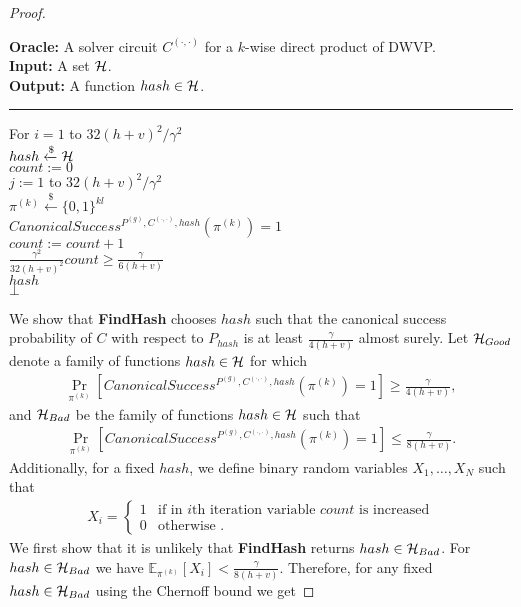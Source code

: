 \begin{proof}
\begin{codeblock}
  \textbf{Oracle:} A solver circuit $C^{(\cdot, \cdot)}$ for a $k$-wise direct product of DWVP. \\
  \textbf{Input:} A set $\mathcal{H}$.\\
  \textbf{Output:} A function $hash \in \mathcal{H}$.
  \medskip\hrule\medskip
  For $i = 1$ to $32(h+v)^2/\gamma^2$ \\
  \IndI $hash \xleftarrow{\$} \mathcal{H}$ \\
  \IndI $count := 0$ \\
  \IndI \For $j := 1$ to $32(h+v)^2/\gamma^2$ \\
  \IndII $\pi^{(k)} \xleftarrow{\$} \{0,1\}^{kl} $\\
  \IndII \If $CanonicalSuccess^{P^{(g)}, C^{(\cdot, \cdot)}, hash}(\pi^{(k)}) = 1$ \then \\
  \IndIII $count := count + 1$\\
  \IndI \If $\frac{\gamma^2}{32(h+v)^2} count \geq \frac{\gamma}{6(h+v)}$ \\
  \IndII \return $hash$\\
  \return $\bot$
\end{codeblock}
We show that \textbf{FindHash} chooses $hash$ such
that the canonical success probability of $C$
with respect to $P_{hash}$ is at least $\frac{\gamma}{4(h+v)}$ almost surely.
Let $\mathcal{H}_{Good}$ denote a family of functions $hash \in \mathcal{H}$ for which
\begin{align*}
\underset{\pi^{(k)}}{\Pr}[CanonicalSuccess^{P^{(g)}, C^{(\cdot, \cdot)}, hash}(\pi^{(k)}) = 1] \geq \frac{\gamma}{4(h+v)},
\end{align*}
and $\mathcal{H}_{Bad}$ be the family of functions $hash \in \mathcal{H}$ such that
\begin{align*}
\underset{\pi^{(k)}}{\Pr}[CanonicalSuccess^{P^{(g)}, C^{(\cdot, \cdot)}, hash}(\pi^{(k)}) = 1] \leq \frac{\gamma}{8(h+v)}.
\end{align*}
Additionally, for a fixed $hash$, we define binary random variables $X_1, \dots, X_N$ such that
\begin{align*}
  X_i =
  \begin{cases}
    1 & \text{if in $i$th iteration variable $count$ is increased}\\
    0 & \text{otherwise .}
  \end{cases}
\end{align*}
We first show that it is unlikely that \textbf{FindHash} returns $hash \in \mathcal{H}_{Bad}$.
For $hash \in \mathcal{H}_{Bad}$ we have $\mathbb{E}_{\pi^{(k)}}[X_i] < \frac{\gamma}{8(h+v)}$.
Therefore, for any fixed $hash \in \mathcal{H}_{Bad}$ using the Chernoff bound we get

\end{proof}

